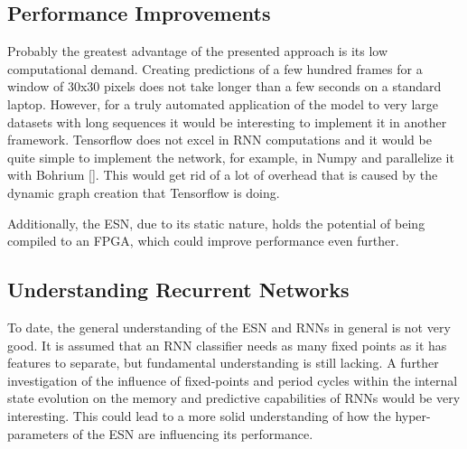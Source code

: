\subsection{Performance Improvements}
Probably the greatest advantage of the presented approach is its low computational
demand. Creating predictions of a few hundred frames for a window of 30x30
pixels does not take longer than a few seconds on a standard laptop.  However,
for a truly automated application of the model to very large datasets with long
sequences it would be interesting to implement it in another framework.
Tensorflow does not excel in RNN computations and it would be quite simple to
implement the network, for example, in Numpy and parallelize it with Bohrium
[\cite{bohrium}]. This would get rid of a lot of overhead that is caused by the
dynamic graph creation that Tensorflow is doing.

Additionally, the ESN, due to its static nature, holds the potential of being
compiled to an FPGA, which could improve performance even further.


\subsection{Understanding Recurrent Networks}
To date, the general understanding of the ESN and RNNs in general is not very
good.  It is assumed that an RNN classifier needs as many fixed points as it
has features to separate, but fundamental understanding is still lacking.  A
further investigation of the influence of fixed-points and period cycles within
the internal state evolution on the memory and predictive capabilities of RNNs
would be very interesting.  This could lead to a more solid understanding of
how the hyper-parameters of the ESN are influencing its performance.

